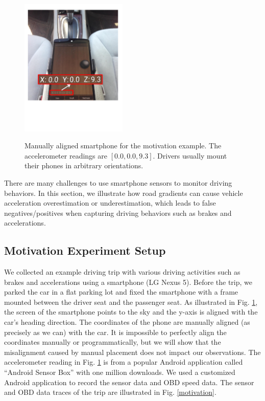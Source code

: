 

\begin{figure}[!tbp]
\begin{center}
\includegraphics[width=2.0in, angle=0]{Figs/SlopeAware/placement.pdf}
\vspace{-1.5cm}
\caption{Manually aligned smartphone for the motivation example. 
The accelerometer readings are $[0.0, 0.0, 9.3]$.
Drivers usually mount their phones in arbitrary orientations.}
\vspace{-0.8cm}
\label{placement}
\end{center}
\end{figure}


There are many challenges to use smartphone sensors
to monitor driving behaviors. 
In this section, we illustrate how road gradients can cause 
vehicle acceleration overestimation or underestimation, 
which leads to false negatives/positives
when capturing driving behaviors such as brakes and accelerations.


\subsection{Motivation Experiment Setup}

We collected an example driving trip with various driving activities 
such as brakes and accelerations using a smartphone (LG Nexus 5).
Before the trip, we parked the car in a flat parking lot and fixed
the smartphone with a frame mounted between the driver seat
and the passenger seat.
As illustrated in Fig. \ref{placement}, the screen of the smartphone points to 
the sky and the y-axis is aligned with 
the car's heading direction.
The coordinates of the phone are manually aligned (as precisely as we can) with the car. 
It is impossible to perfectly align the coordinates 
manually or programmatically,
but we will show that the misalignment caused by manual placement
does not impact our observations.
The accelerometer reading in Fig. \ref{placement} is from a popular 
Android application called ``Android Sensor Box'' with one million downloads.
We used a customized Android application to record the sensor data and OBD speed data.
The sensor and OBD data traces of the trip are illustrated in Fig. \ref{motivation}.


